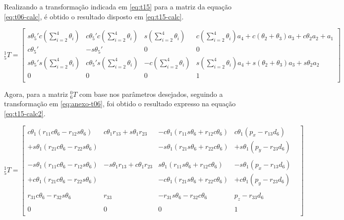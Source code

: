 Realizando a transformação indicada em \ref{eq:t15} para a matriz da equação \ref{eq:t06-calc}, é obtido o resultado
disposto em \ref{eq:t15-calc}.

\begin{equation}
    \label{eq:t15-calc}
    ^1_5T = 
    \begin{bmatrix}
        s\theta_5'c(\sum\limits_{i=2}^4\theta_i) & c\theta_5'c(\sum\limits_{i=2}^4\theta_i) & s(\sum\limits_{i=2}^4\theta_i)  & c(\sum\limits_{i=2}^4\theta_i)a_4 + c(\theta_2+\theta_3)a_3 + c\theta_2a_2 + a_1 \\
        c\theta_5'          & -s\theta_5'         & 0          & 0 \\
        s\theta_5's(\sum\limits_{i=2}^4\theta_i) & c\theta_5's(\sum\limits_{i=2}^4\theta_i) & -c(\sum\limits_{i=2}^4\theta_i) & s(\sum\limits_{i=2}^4\theta_i)a_4 + s(\theta_2+\theta_3)a_3 + s\theta_2a_2 \\
           0   &    0   &    0   &  1  \\    
    \end{bmatrix}
\end{equation}

Agora, para a matriz $^0_6T$ com base nos parâmetros desejados, seguindo a transformação em \ref{eq:anexo-t06}, 
foi obtido o resultado expresso na equação \ref{eq:t15-calc2}.

\begin{equation}
    \label{eq:t15-calc2}
    ^1_5T = 
    \begin{bmatrix}
         c\theta_1(r_{11}c\theta_6-r_{12}s\theta_6) &  c\theta_1r_{13}+s\theta_1r_{23} & -c\theta_1(r_{11}s\theta_6+r_{12}c\theta_6) &  c\theta_1(p_x-r_{13}d_6) \\
        +s\theta_1(r_{21}c\theta_6-r_{22}s\theta_6) &                      & -s\theta_1(r_{21}s\theta_6+r_{22}c\theta_6) & +s\theta_1(p_y-r_{23}d_6) \\
        & & & & \\
        -s\theta_1(r_{11}c\theta_6-r_{12}s\theta_6) & -s\theta_1r_{13}+c\theta_1r_{23} &  s\theta_1(r_{11}s\theta_6+r_{12}c\theta_6) & -s\theta_1(p_x-r_{13}d_6) \\
        +c\theta_1(r_{21}c\theta_6-r_{22}s\theta_6) &                      & -c\theta_1(r_{21}s\theta_6+r_{22}c\theta_6) & +c\theta_1(p_y-r_{23}d_6) \\
        & & & & \\        
             r_{31}c\theta_6-r_{32}s\theta_6  &         r_{33}       &     -r_{31}s\theta_6-r_{32}c\theta_6  &      p_z-r_{33}d_6  \\
        & & & & \\
                    0             &            0         &              0            &           1         \\    
    \end{bmatrix}
\end{equation}

